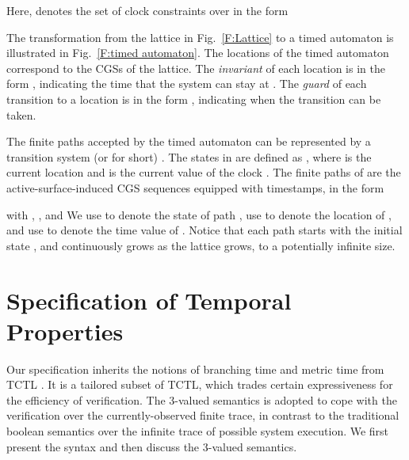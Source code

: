 \documentclass[10pt,conference,compsocconf,letterpaper]{IEEEtran}
\begin{document}
\noindent Here,  denotes the set of clock constraints over  in the form


The transformation from the lattice in Fig.~\ref{F:Lattice} to a timed automaton is illustrated in Fig.~\ref{F:timed automaton}. The locations of the timed automaton correspond to the CGSs of the lattice. The \textit{invariant} of each location  is in the form , indicating the time that the system can stay at . The \textit{guard} of each transition to a location  is in the form , indicating when the transition can be taken.

\iffalse
The timed automaton  can be characterized by a transition system  where
\begin{itemize}
    \item ;
    \item ;
    \item ;
    \item ;
    \item ;
    \item  XXXXX
    \item  XXXXX
\end{itemize}
 XXXXX.  XXXXX.
\fi

The finite paths accepted by the timed automaton can be represented by a transition system  (or  for short) \cite{Baier08}. The states  in  are defined as , where  is the current location and  is the current value of the clock . The finite paths  of  are the active-surface-induced CGS sequences equipped with timestamps, in the form

with , , and 
We use  to denote the  state of path , use  to denote the location of , and use  to denote the time value of . Notice that each path starts with the initial state , and continuously grows as the lattice grows, to a potentially infinite size.

\section{Specification of Temporal Properties} \label{sec:Specification}

Our specification inherits the notions of branching time and metric time from TCTL \cite{Alur94}. It is a tailored subset of TCTL, which trades certain expressiveness for the efficiency of verification. The 3-valued semantics is adopted to cope with the verification over the currently-observed finite trace, in contrast to the traditional boolean semantics over the infinite trace of possible system execution. We first present the syntax and then discuss the 3-valued semantics.
\end{document}

